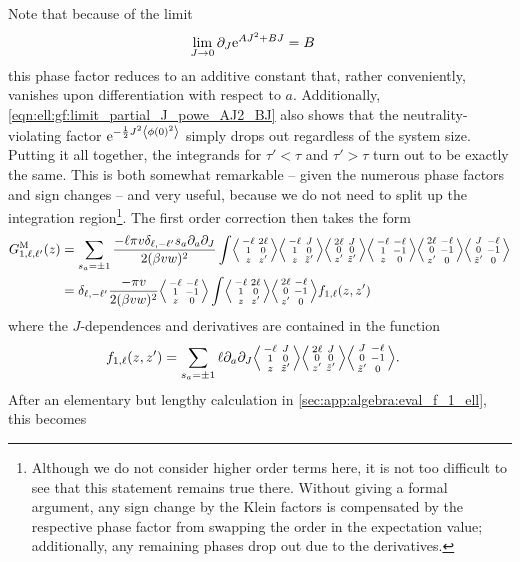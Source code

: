Note that because of the limit
\begin{align}
\lim_{J\rightarrow 0} \partial_J \powe{AJ^2 + BJ} &= B \label{eqn:ell:gf:limit_partial_J_powe_AJ2_BJ}
\end{align}
this phase factor reduces to an additive constant that, rather conveniently, vanishes upon differentiation with respect to $a$.
Additionally, \autoref{eqn:ell:gf:limit_partial_J_powe_AJ2_BJ} also shows that the neutrality-violating factor $\powe{-\frac{1}{2} J^2 \bra*{\phi(0)^2}}$ simply drops out regardless of the system size.\\
Putting it all together, the integrands for $\tau'<\tau$ and $\tau'>\tau$ turn out to be exactly the same.
This is both somewhat remarkable -- given the numerous phase factors and sign changes -- and very useful, because we do not need to split up the integration region\footnote{Although we do not consider higher order terms here, it is not too difficult to see that this statement remains true there. Without giving a formal argument, any sign change by the Klein factors is compensated by the respective phase factor from swapping the order in the expectation value; additionally, any remaining phases drop out due to the derivatives. %
}.
The first order correction then takes the form
\begin{align*}
G_{1,\ell,\ell'}^\M(z) &= \sum_{s_a=\pm 1} \frac{-\ell\pi v \delta_{\ell,-\ell'} s_a\partial_a \partial_J}{2(\beta v w)^2} \int \bra*{\abx{-\ell&2\ell}{1&0}{z&z'}} \bra*{\abx{-\ell&J}{1&0}{z&\tilde{z}'}} \bra*{\abx{2\ell&J}{0&0}{z'&\tilde{z}'}} \bra*{\abx{-\ell&-\ell}{1&-1}{z&0}} \bra*{\abx{2\ell&-\ell}{0&-1}{z'&0}} \bra*{\abx{J&-\ell}{0&-1}{\tilde{z}'&0}}\\
&= \delta_{\ell,-\ell'} \frac{-\pi v}{2(\beta vw)^2} \bra*{\abx{-\ell&-\ell}{1&-1}{z&0}} \int \bra*{\abx{-\ell&2\ell}{1&0}{z&z'}} \bra*{\abx{2\ell&-\ell}{0&-1}{z'&0}} f_{1,\ell}(z,z')
\end{align*}
where the $J$-dependences and derivatives are contained in the function
\begin{align*}
f_{1,\ell}(z,z') &= \sum_{s_a=\pm 1} \ell\partial_a \partial_J \bra*{\abx{-\ell&J}{1&0}{z&\tilde{z}'}} \bra*{\abx{2\ell&J}{0&0}{z'&\tilde{z}'}} \bra*{\abx{J&-\ell}{0&-1}{\tilde{z}'&0}}.
\end{align*}
After an elementary but lengthy calculation in \autoref{sec:app:algebra:eval_f_1_ell}, this becomes
